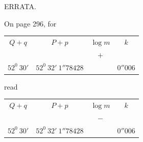 \par\bigskip{}
\begin{center}\large ERRATA.\end{center}
\par\noindent On page 296, for
\begin{center}
\begin{tabular}{c|c|c|c}
\(Q+q\)&\(P+p\)&\(\log m\)&\(k\)\\
&&\(+\)&\\
\(52^{0}\ 30'\)&\(52^{0}\ 32'\ 1''78428\)&&\(0''006\)
\end{tabular}
\end{center}
\noindent read
\begin{center}
\begin{tabular}{c|c|c|c}
\(Q+q\)&\(P+p\)&\(\log m\)&\(k\)\\
&&\(-\)&\\
\(52^{0}\ 30'\)&\(52^{0}\ 32'\ 1''78428\)&&\(0''006\)
\end{tabular}
\end{center}
